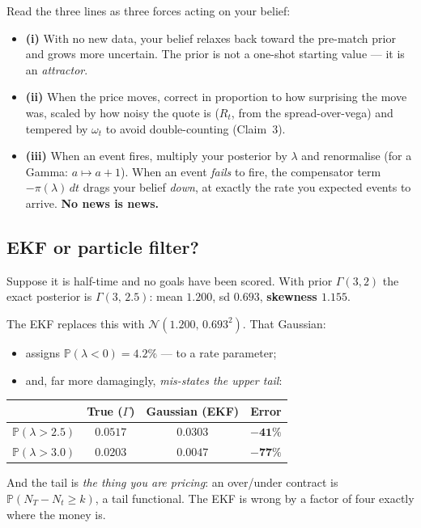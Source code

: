 \documentclass[11pt,a4paper]{article}
\theoremstyle{plain}
\begin{document}
\begin{plain}
Read the three lines as three forces acting on your belief:
\begin{itemize}
\item \textbf{(i)} With no new data, your belief relaxes back toward the pre-match prior and
grows more uncertain. The prior is not a one-shot starting value --- it is an \emph{attractor}.
\item \textbf{(ii)} When the price moves, correct in proportion to how surprising the move was,
scaled by how noisy the quote is ($R_t$, from the spread-over-vega) and tempered by $\omega_t$
to avoid double-counting (Claim~3).
\item \textbf{(iii)} When an event fires, multiply your posterior by $\lambda$ and renormalise
(for a Gamma: $a \mapsto a+1$). When an event \emph{fails} to fire, the compensator term
$-\pi(\lambda)\,dt$ drags your belief \emph{down}, at exactly the rate you expected events to
arrive. \textbf{No news is news.}
\end{itemize}
\end{plain}

\subsection*{EKF or particle filter?}

\begin{worked}
Suppose it is half-time and no goals have been scored. With prior $\Gamma(3,2)$ the exact
posterior is $\Gamma(3,\,2.5)$: mean $1.200$, sd $0.693$, \textbf{skewness $1.155$}.

The EKF replaces this with $\mathcal{N}(1.200,\,0.693^2)$. That Gaussian:
\begin{itemize}
\item assigns $\mathbb{P}(\lambda<0) = \mathbf{4.2\%}$ --- to a rate parameter;
\item and, far more damagingly, \emph{mis-states the upper tail}:
\end{itemize}
\begin{center}
\begin{tabular}{@{}lccc@{}}
\toprule
& True ($\Gamma$) & Gaussian (EKF) & Error \\
\midrule
$\mathbb{P}(\lambda > 2.5)$ & $0.0517$ & $0.0303$ & $\mathbf{-41\%}$ \\
$\mathbb{P}(\lambda > 3.0)$ & $0.0203$ & $0.0047$ & $\mathbf{-77\%}$ \\
\bottomrule
\end{tabular}
\end{center}

\smallskip
And the tail is \emph{the thing you are pricing}: an over/under contract is
$\mathbb{P}(N_T - N_t \ge k)$, a tail functional. The EKF is wrong by a factor of four exactly
where the money is.
\end{worked}
\end{document}
